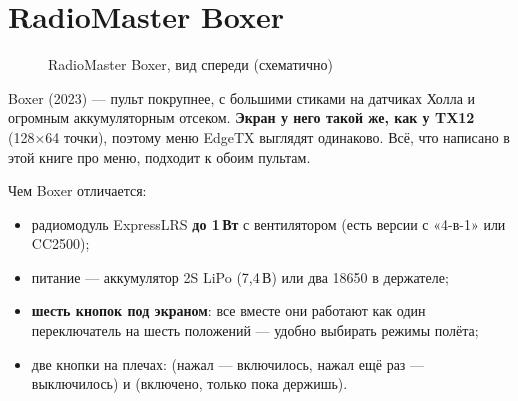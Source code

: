 \section{RadioMaster Boxer}

\begin{figure}[H]
\centering
{}
\caption{RadioMaster Boxer, вид спереди (схематично)}
\label{fig:boxer}
\end{figure}

Boxer (2023) --- пульт покрупнее, с большими стиками на датчиках Холла и огромным
аккумуляторным отсеком. \textbf{Экран у него такой же, как у TX12} (128×64 точки), поэтому
меню EdgeTX выглядят одинаково. Всё, что написано в этой книге про меню, подходит к обоим
пультам.

Чем Boxer отличается:
\begin{itemize}
  \item радиомодуль ExpressLRS \textbf{до 1\,Вт} с вентилятором (есть версии с «4-в-1» или CC2500);
  \item питание --- аккумулятор 2S LiPo (7,4\,В) или два 18650 в держателе;
  \item \textbf{шесть кнопок под экраном}: все вместе они работают как один переключатель
        на шесть положений --- удобно выбирать режимы полёта;
  \item две кнопки на плечах:  (нажал --- включилось, нажал ещё раз --- выключилось)
        и  (включено, только пока держишь).
\end{itemize}

